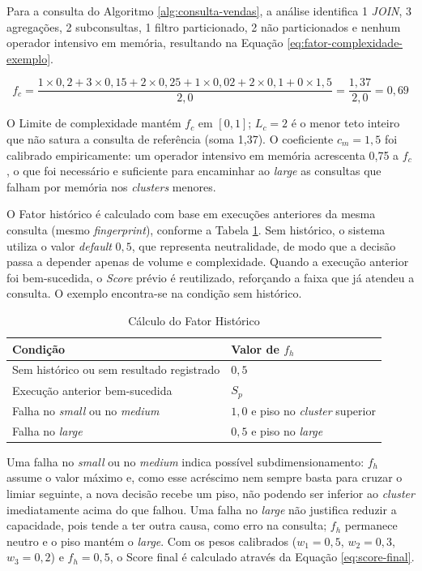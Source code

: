 Para a consulta do Algoritmo \ref{alg:consulta-vendas}, a análise identifica 1 \textit{JOIN}, 3 agregações, 2 subconsultas, 1 filtro particionado, 2 não particionados e nenhum operador intensivo em memória, resultando na Equação \ref{eq:fator-complexidade-exemplo}.

\begin{equation}
\label{eq:fator-complexidade-exemplo}
f_c = \frac{1 \times 0,2 + 3 \times 0,15 + 2 \times 0,25 + 1 \times 0,02 + 2 \times 0,1 + 0 \times 1,5}{2,0} = \frac{1,37}{2,0} = 0,69
\end{equation}

O Limite de complexidade mantém $f_c$ em $[0,1]$; $L_c = 2$ é o menor teto inteiro que não satura a consulta de referência (soma 1,37). O coeficiente $c_m = 1,5$ foi calibrado empiricamente: um operador intensivo em memória acrescenta 0,75 a $f_c$, o que foi necessário e suficiente para encaminhar ao \textit{large} as consultas que falham por memória nos \textit{clusters} menores.

O Fator histórico é calculado com base em execuções anteriores da mesma consulta (mesmo \textit{fingerprint}), conforme a Tabela \ref{tab:fator-historico}. Sem histórico, o sistema utiliza o valor \textit{default} $0,5$, que representa neutralidade, de modo que a decisão passa a depender apenas de volume e complexidade. Quando a execução anterior foi bem-sucedida, o \textit{Score} prévio é reutilizado, reforçando a faixa que já atendeu a consulta. O exemplo encontra-se na condição sem histórico.

\begin{table}[H]
	\centering
	\caption{Cálculo do Fator Histórico}
	\label{tab:fator-historico}
	\begin{tabular}{ll}
	\hline
	\textbf{Condição} & \textbf{Valor de $f_h$} \\
	\hline
	Sem histórico ou sem resultado registrado & $0,5$ \\
	Execução anterior bem-sucedida & $S_p$ \\
	Falha no \textit{small} ou no \textit{medium} & $1,0$ e piso no \textit{cluster} superior \\
	Falha no \textit{large} & $0,5$ e piso no \textit{large} \\
	\hline
	\end{tabular}
\end{table}

Uma falha no \textit{small} ou no \textit{medium} indica possível subdimensionamento: $f_h$ assume o valor máximo e, como esse acréscimo nem sempre basta para cruzar o limiar seguinte, a nova decisão recebe um piso, não podendo ser inferior ao \textit{cluster} imediatamente acima do que falhou. Uma falha no \textit{large} não justifica reduzir a capacidade, pois tende a ter outra causa, como erro na consulta; $f_h$ permanece neutro e o piso mantém o \textit{large}. Com os pesos calibrados ($w_1 = 0,5$, $w_2 = 0,3$, $w_3 = 0,2$) e $f_h = 0,5$, o Score final é calculado através da Equação \ref{eq:score-final}.

